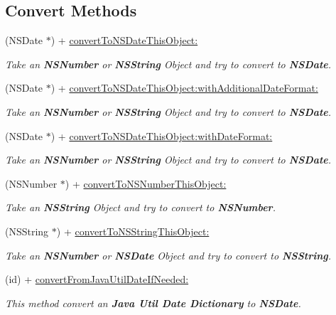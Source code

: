 \subsection*{Convert Methods}
\begin{DoxyCompactItemize}
\item 
(NSDate $\ast$) + \hyperlink{interface_j_p_data_converter_a710a5ee9440e968389bd32cd8e9c914c}{convertToNSDateThisObject:}
\begin{DoxyCompactList}\small\item\em Take an {\bfseries NSNumber} or {\bfseries NSString} Object and try to convert to {\bfseries NSDate}. \item\end{DoxyCompactList}\item 
(NSDate $\ast$) + \hyperlink{interface_j_p_data_converter_a77cd52d9cdfc64f12ad531a0c52d7844}{convertToNSDateThisObject:withAdditionalDateFormat:}
\begin{DoxyCompactList}\small\item\em Take an {\bfseries NSNumber} or {\bfseries NSString} Object and try to convert to {\bfseries NSDate}. \item\end{DoxyCompactList}\item 
(NSDate $\ast$) + \hyperlink{interface_j_p_data_converter_a49f3512191f838b23cb57dabc8bec8f6}{convertToNSDateThisObject:withDateFormat:}
\begin{DoxyCompactList}\small\item\em Take an {\bfseries NSNumber} or {\bfseries NSString} Object and try to convert to {\bfseries NSDate}. \item\end{DoxyCompactList}\item 
(NSNumber $\ast$) + \hyperlink{interface_j_p_data_converter_a10057d262d500de618510d50326d0165}{convertToNSNumberThisObject:}
\begin{DoxyCompactList}\small\item\em Take an {\bfseries NSString} Object and try to convert to {\bfseries NSNumber}. \item\end{DoxyCompactList}\item 
(NSString $\ast$) + \hyperlink{interface_j_p_data_converter_a597e5f29b306f2bd75090de47de653f9}{convertToNSStringThisObject:}
\begin{DoxyCompactList}\small\item\em Take an {\bfseries NSNumber} or {\bfseries NSDate} Object and try to convert to {\bfseries NSString}. \item\end{DoxyCompactList}\item 
(id) + \hyperlink{interface_j_p_data_converter_a2601263deda1b3e95ca55969011b637f}{convertFromJavaUtilDateIfNeeded:}
\begin{DoxyCompactList}\small\item\em This method convert an {\bfseries Java Util Date Dictionary} to {\bfseries NSDate}. \item\end{DoxyCompactList}\end{DoxyCompactItemize}


